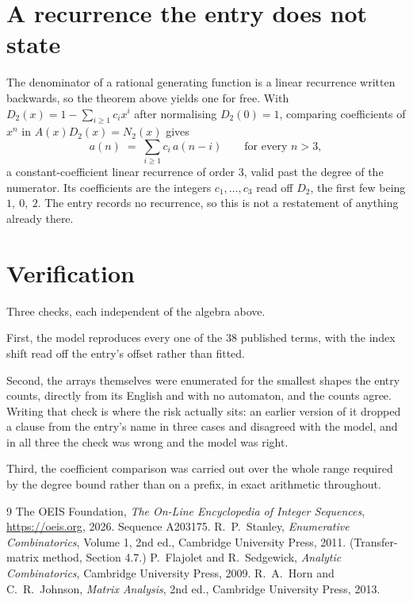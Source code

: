 \documentclass[11pt,a4paper]{article}
\theoremstyle{plain}
\theoremstyle{definition}
\begin{document}
\section{A recurrence the entry does not state}

The denominator of a rational generating function is a linear recurrence written backwards, so
the theorem above yields one for free. With $D_2(x)=1-\sum_{i\ge1}c_ix^i$ after normalising
$D_2(0)=1$, comparing coefficients of $x^n$ in $A(x)D_2(x)=N_2(x)$ gives
\[
a(n)\;=\;\sum_{i\ge1}c_i\,a(n-i)\qquad\text{for every }n>3,
\]
a constant-coefficient linear recurrence of order $3$, valid past the degree of the
numerator. Its coefficients are the integers $c_1,\dots,c_{3}$ read off $D_2$, the first few being $1,\ 0,\ 2$. The entry records no recurrence, so this is not a restatement of anything
already there.

\section{Verification}

Three checks, each independent of the algebra above.

First, the model reproduces every one of the $38$ published terms, with the index shift
read off the entry's offset rather than fitted.

Second, the arrays themselves were enumerated for the smallest shapes the entry counts,
directly from its English and with no automaton, and the counts agree. Writing that check is
where the risk actually sits: an earlier version of it dropped a clause from the entry's name
in three cases and disagreed with the model, and in all three the check was wrong and the model
was right.

Third, the coefficient comparison was carried out over the whole range required by the degree
bound rather than on a prefix, in exact arithmetic throughout.

\begin{thebibliography}{9}
 The OEIS Foundation, \emph{The On-Line Encyclopedia of Integer
Sequences}, \url{https://oeis.org}, 2026. Sequence A203175.
 R.~P.~Stanley, \emph{Enumerative Combinatorics}, Volume 1, 2nd ed.,
Cambridge University Press, 2011. (Transfer-matrix method, Section 4.7.)
 P.~Flajolet and R.~Sedgewick, \emph{Analytic Combinatorics}, Cambridge
University Press, 2009.
 R.~A.~Horn and C.~R.~Johnson, \emph{Matrix Analysis}, 2nd ed., Cambridge
University Press, 2013.
\end{thebibliography}
\end{document}
